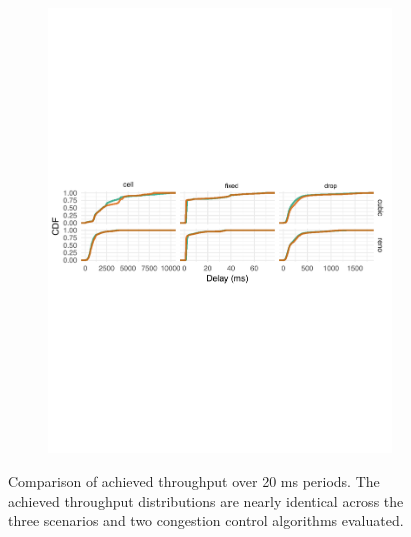 \documentclass[format=acmlarge,10pt,screen,nonacm,natbib=false]{acmart}
\begin{document}
\begin{sloppypar}
\begin{figure}[h!]
\begin{subfigure}{\columnwidth}
\includegraphics[width=\columnwidth]{img/delay-cdf-flat}
\label{fig:eval:fidelity:delay-cdf}
\end{subfigure}
%
\caption{Comparison of achieved throughput over 20 ms periods. The achieved throughput distributions are nearly identical across the three scenarios and two congestion control algorithms evaluated.}\label{fig:eval:fidelity:cdfs-new}
\end{figure}



\end{sloppypar}
\end{document}
